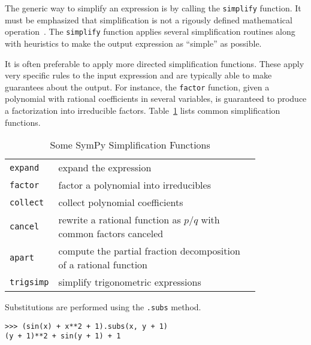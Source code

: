 



The generic way to simplify an expression is by calling the \texttt{simplify}
function.
It must be emphasized that simplification is not a rigously defined
mathematical operation~\cite{Carette2004understanding}.
The \texttt{simplify} function applies several simplification routines along
with heuristics to make the output expression as ``simple'' as possible.

It is often preferable to apply more directed simplification functions. These
apply very specific rules to the input expression and are typically able to make
guarantees about the output. For instance, the \texttt{factor} function,
given a polynomial with rational coefficients in several variables,
is guaranteed to
produce a factorization into irreducible factors. Table~\ref{simplify-table}
lists common simplification functions.

\begin{longtable}[htbc]{lp{0.83\linewidth}}
\caption{Some SymPy Simplification Functions\label{simplify-table}}\\
\toprule
\verb|expand| & expand the expression \\
\verb|factor| & factor a polynomial into irreducibles \\
\verb|collect| & collect polynomial coefficients \\
\verb|cancel| & rewrite a rational function as $p/q$ with common factors
canceled \\
\verb|apart| & compute the partial fraction decomposition of a rational function
\\
\verb|trigsimp| & simplify trigonometric expressions~\cite{fu2006automated} \\
\bottomrule
\end{longtable}

Substitutions are performed using the \texttt{.subs} method.
\begin{verbatim}
>>> (sin(x) + x**2 + 1).subs(x, y + 1)
(y + 1)**2 + sin(y + 1) + 1
\end{verbatim}

